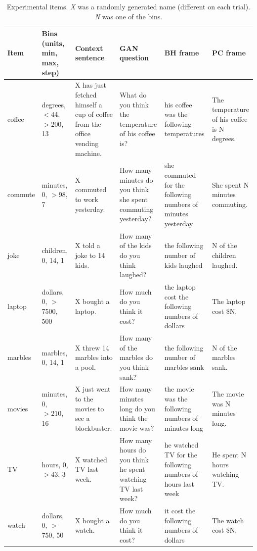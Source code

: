 \documentclass[10pt,letterpaper]{article}
\begin{document}
\begin{table}
  \footnotesize
  \centering
  \begin{tabular}{l p{2.2cm} p{2.5cm} p{3.5cm} p{3cm} p{2.5cm}}
	\toprule
	Item & Bins (units, min, max, step) & Context sentence & GAN question & BH frame & PC frame \\
	\midrule
    coffee & degrees, $<$44, $>200$, 13& X has just fetched himself a cup of coffee from the office vending machine. & What do you think the temperature of his coffee is?  & his coffee was the following temperatures & The temperature of his coffee is N degrees.\\
	commute & minutes, 0, $>$98, 7 & X commuted to work yesterday. & How many minutes do you think she spent commuting yesterday? & she commuted for the following numbers of minutes yesterday & She spent N minutes commuting.\\
	joke & children, 0, 14, 1  & X told a joke to 14 kids. & How many of the kids do you think laughed? & the following number of kids laughed & N of the children laughed.\\
    
	laptop & dollars, 0, $>$7500, 500& X bought a laptop. & How much do you think it cost? & the laptop cost the following numbers of dollars & The laptop cost \$N.\\
    marbles & marbles, 0, 14, 1 & X threw 14 marbles into a pool. & How many of the marbles do you think sank? & the following number of marbles sank & N of the marbles sank.\\

	movies & minutes, 0, $>210$, 16& X just went to the movies to see a blockbuster. & How many minutes long do you think the movie was? & the movie was the following numbers of minutes long & The movie was N minutes long.\\

	TV & hours, 0, $>$43, 3& X watched TV last week. & How many hours do you think he spent watching TV last week? & he watched TV for the following numbers of hours last week & He spent N hours watching TV.\\

	watch & dollars, 0, $>$750, 50 & X bought a watch.& How much do you think it cost? & it cost the following numbers of dollars & The watch cost \$N.\\
    \bottomrule
  \end{tabular}
  \caption{Experimental items. \emph{X} was a randomly generated name (different on each trial). \emph{N} was one of the bins.}
  \label{tab:Items}
\end{table}
\end{document}
